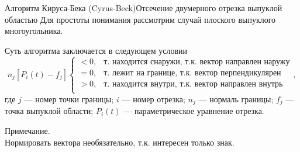 \documentclass{beamer}
\begin{document}
	\begin{frame}{Алгоритм Кируса-Бека (Cyrus-Beck)}{Отсечение двумерного отрезка выпуклой областью}
		Для простоты понимания рассмотрим случай плоского выпуклого многоугольника.

		Суть алгоритма заключается в следующем условии
		\[
			n_j [P_i(t) - f_j]
			\begin{cases}
				< 0, & \text{т. находится снаружи, т.к. вектор направлен наружу} \\
				= 0, & \text{т. лежит на границе, т.к. вектор перпендикулярен} \\
				> 0, & \text{т. находится внутри, т.к. вектор направлен внутрь} \\
			\end{cases}
			,
		\]
		где
		$j$ --- номер точки границы;
		$i$ --- номер отрезка;
		$n_j$ --- нормаль границы;
		$f_j$ --- точка выпуклой области;
		$P_i(t)$ --- параметрическое уравнение отрезка.
		
		Примечание. \\ Нормировать вектора необязательно, т.к. интересен только знак.

\end{frame}
\end{document}
